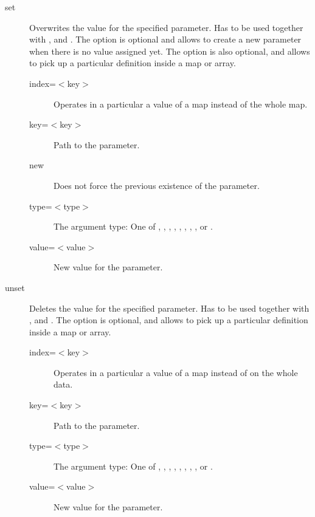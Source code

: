 \begin{description}
\item[set] Overwrites the value for the specified parameter. Has to be used together with ,  and . The option  is optional and allows to create a new parameter when there is no value assigned yet. The option  is also optional, and allows to pick up a particular definition inside a map or array.
\begin{description}
\item[index=$<$key$>$] Operates in a particular a value of a map instead of the whole map.
\item[key=$<$key$>$] Path to the parameter.
\item[new] Does not force the previous existence of the parameter.
\item[type=$<$type$>$] The argument type: One of , , , , , , , ,  or .
\item[value=$<$value$>$] New value for the parameter.
\end{description}

\item[unset] Deletes the value for the specified parameter. Has to be used together with ,  and . The option  is optional, and allows to pick up a particular definition inside a map or array.
\begin{description}
\item[index=$<$key$>$] Operates in a particular a value of a map instead of on the whole data.
\item[key=$<$key$>$] Path to the parameter.
\item[type=$<$type$>$] The argument type: One of , , , , , , , ,  or .
\item[value=$<$value$>$] New value for the parameter.
\end{description}

\end{description}

